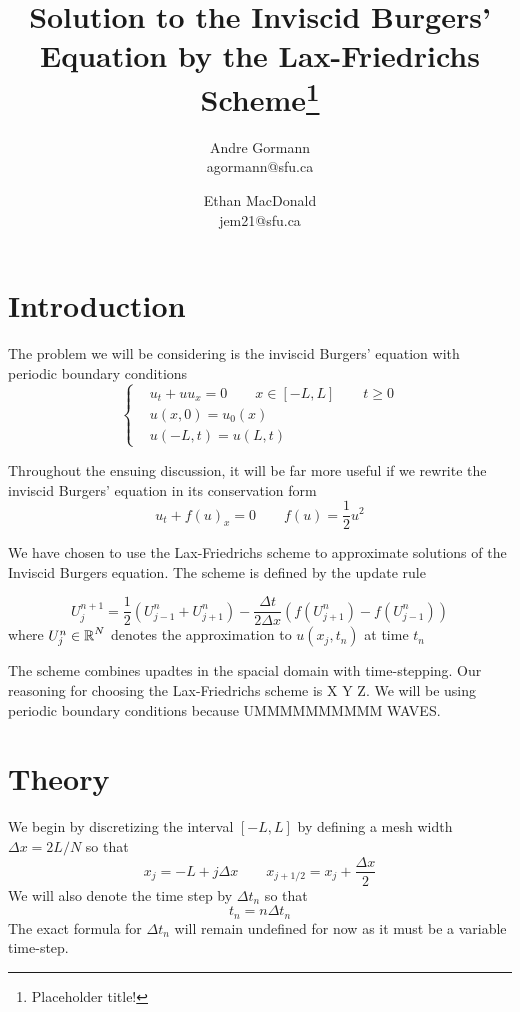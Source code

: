 \documentclass{myproject}
\title{\vspace*{-1cm}Solution to the Inviscid Burgers' Equation by the Lax-Friedrichs Scheme\footnote{Placeholder title!}}
\date{}
\author{
    Andre Gormann\\
    agormann@sfu.ca
    \and
    Ethan MacDonald\\
    jem21@sfu.ca
}
\begin{document}
\maketitle
\vspace*{-1cm}


\section{Introduction}

The problem we will be considering is the inviscid Burgers' equation with periodic boundary conditions
\begin{equation}
    \begin{cases}
        & u_t + uu_x = 0 \qquad x \in [-L, L] \qquad t \geq 0 \\
        & u(x,0) = u_0(x) \\
        & u(-L,t) = u(L,t)
    \end{cases}
\end{equation}

Throughout the ensuing discussion, it will be far more useful if we rewrite the inviscid Burgers' equation in its conservation form
\begin{equation}
    u_t + f(u)_x = 0 \qquad f(u) = \frac{1}{2}u^2
\end{equation}

We have chosen to use the Lax-Friedrichs scheme to approximate solutions of the Inviscid Burgers equation. The scheme is defined by the update rule

\[
    U_j^{n+1} = \frac{1}{2}\left( U_{j-1}^{n} + U_{j+1}^{n} \right) - \frac{\Delta t}{2\Delta x}\left( f(U_{j+1}^{n}) - f(U_{j-1}^{n}) \right)
\]
where $U_{j}^{n} \in \operatorname{\mathbb{R}}^N$ denotes the approximation to $u(x_j,t_n)$ at time $t_n$

The scheme combines upadtes in the spacial domain with time-stepping. Our reasoning for choosing the Lax-Friedrichs scheme is X Y Z. We will be using periodic boundary conditions because UMMMMMMMMMM WAVES.

\section{Theory}

We begin by discretizing the interval $[-L,L]$ by defining a mesh width $\Delta x = 2L/N$ so that 
\[
    x_j = -L + j\Delta x \qquad x_{j+1/2} = x_j + \frac{\Delta x}{2}
\]
We will also denote the time step by $\Delta t_n$ so that
\[
    t_n = n\Delta t_n
\]
The exact formula for $\Delta t_n$ will remain undefined for now as it must be a variable time-step.
\end{document}
